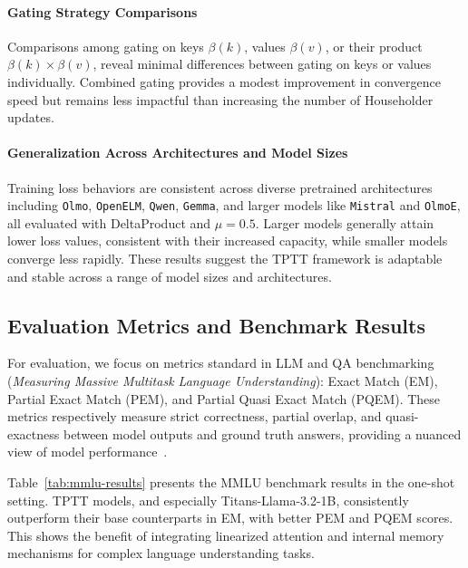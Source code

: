 \documentclass[10pt,a4paper]{article}
\begin{document}
\paragraph{Gating Strategy Comparisons}

Comparisons among gating on keys \(\beta(k)\), values \(\beta(v)\), or their product \(\beta(k) \times \beta(v)\), reveal minimal differences between gating on keys or values individually. Combined gating provides a modest improvement in convergence speed but remains less impactful than increasing the number of Householder updates.

\paragraph{Generalization Across Architectures and Model Sizes}

Training loss behaviors are consistent across diverse pretrained architectures including \texttt{Olmo}, \texttt{OpenELM}, \texttt{Qwen}, \texttt{Gemma}, and larger models like \texttt{Mistral} and \texttt{OlmoE}, all evaluated with DeltaProduct and \(\mu=0.5\). Larger models generally attain lower loss values, consistent with their increased capacity, while smaller models converge less rapidly. These results suggest the TPTT framework is adaptable and stable across a range of model sizes and architectures.


\subsection{Evaluation Metrics and Benchmark Results}

For evaluation, we focus on metrics standard in LLM and QA benchmarking (\textit{Measuring Massive Multitask Language Understanding}): Exact Match (EM), Partial Exact Match (PEM), and Partial Quasi Exact Match (PQEM). These metrics respectively measure strict correctness, partial overlap, and quasi-exactness between model outputs and ground truth answers, providing a nuanced view of model performance~\cite{hendrycks2020measuring}.

Table~\ref{tab:mmlu-results} presents the MMLU benchmark results in the one-shot setting. TPTT models, and especially Titans-Llama-3.2-1B, consistently outperform their base counterparts in EM, with better PEM and PQEM scores. This shows the benefit of integrating linearized attention and internal memory mechanisms for complex language understanding tasks.
\end{document}
